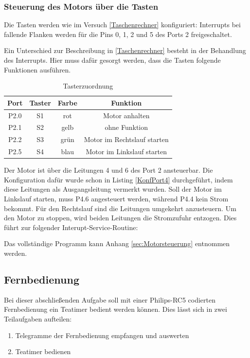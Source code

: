 \documentclass[12pt,a4paper,bibliography=totocnumbered,listof=totocnumbered]{scrartcl}
\begin{document}
\subsubsection{Steuerung des Motors über die Tasten}
Die Tasten werden wie im Versuch \ref{Taschenrechner} konfiguriert: Interrupts bei fallende Flanken werden für die Pins 0, 1, 2 und 5 des Ports 2 freigeschaltet.

Ein Unterschied zur Beschreibung in \ref{Taschenrechner} besteht in der Behandlung des Interrupts. Hier muss dafür gesorgt werden, dass die Tasten folgende Funktionen ausführen.

\begin{table}[h]
	\begin{centering}
		\begin{tabular}{|c|c|c|c|}
			\hline 
			\textbf{Port} & \textbf{Taster} & \textbf{Farbe} & \textbf{Funktion}\tabularnewline
			\hline 
			\hline 
			P2.0 & S1 & rot & Motor anhalten\tabularnewline
			\hline 
			P2.1 & S2 & gelb & ohne Funktion\tabularnewline
			\hline 
			P2.2 & S3 & grün & Motor im Rechtslauf starten\tabularnewline
			\hline 
			P2.5 & S4 & blau & Motor im Linkslauf starten\tabularnewline
			\hline 
		\end{tabular}
		\par\end{centering}
	\smallskip{}
	\protect\caption{Tasterzuordnung}
\end{table}

Der Motor ist über die Leitungen 4 und 6 des Port 2 ansteuerbar. Die Konfiguration dafür wurde schon in Listing \ref{KonfPort4} durchgeführt, indem diese Leitungen als Ausgangsleitung vermerkt wurden.
Soll der Motor im Linkslauf starten, muss P4.6 angesteuert werden, während P4.4 kein Strom bekommt. Für den Rechtslauf sind die Leitungen umgekehrt anzusteuern. Um den Motor zu stoppen, wird beiden Leitungen die Stromzufuhr entzogen. Dies führt zur folgender Interupt-Service-Routine:

\vspace{1em}


Das vollständige Programm kann Anhang \ref{sec:Motorsteuerung} entnommen werden.

\pagebreak

\subsection{Fernbedienung}
Bei dieser abschließenden Aufgabe soll mit einer Philips-RC5 codierten Fernbedienung ein Teatimer bedient werden können. Dies lässt sich in zwei Teilaufgaben aufteilen:
\begin{enumerate}
	\item Telegramme der Fernbedienung empfangen und auswerten
	\item Teatimer bedienen
\end{enumerate}
\end{document}
